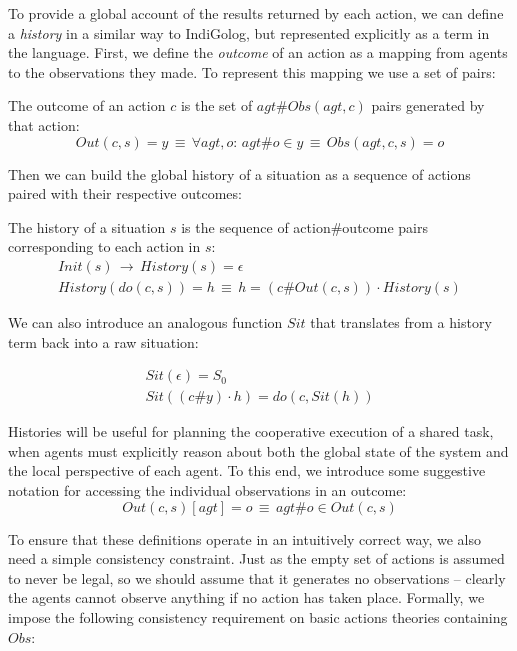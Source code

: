 To provide a global account of the results returned by each action,
we can define a \emph{history} in a similar way to IndiGolog, but
represented explicitly as a term in the language. First, we define
the \emph{outcome} of an action as a mapping from agents to the observations
they made. To represent this mapping we use a set of 
pairs:

\begin{defnL}
[{Outcomes}] The outcome of an action $c$ is the set of
$agt\#Obs(agt,c)$ pairs generated by that action:\[
Out(c,s)=y\,\equiv\,\forall agt,o:\, agt\#o\in y\,\equiv\, Obs(agt,c,s)=o\]

\end{defnL}
Then we can build the global history of a situation as a sequence
of actions paired with their respective outcomes:

\begin{defnL}
[{Histories}] The history of a situation $s$ is the sequence
of action\#outcome pairs corresponding to each action in $s$:\begin{gather*}
Init(s)\,\rightarrow\, History(s)=\epsilon\\
History(do(c,s))=h\,\equiv\, h=(c\#Out(c,s))\cdot History(s)\end{gather*}

\end{defnL}
We can also introduce an analogous function $Sit$ that translates
from a history term back into a raw situation:

\begin{gather*}
Sit(\epsilon)=S_{0}\\
Sit((c\#y)\cdot h)=do(c,Sit(h))\end{gather*}


Histories will be useful for planning the cooperative execution of
a shared task, when agents must explicitly reason about both the global
state of the system and the local perspective of each agent. To this
end, we introduce some suggestive notation for accessing the individual
observations in an outcome:\[
Out(c,s)[agt]=o\,\equiv\, agt\#o\in Out(c,s)\]


To ensure that these definitions operate in an intuitively correct
way, we also need a simple consistency constraint. Just as the empty
set of actions is assumed to never be legal, so we should assume that
it generates no observations -- clearly the agents cannot observe
anything if no action has taken place. Formally, we impose the following
consistency requirement on basic actions theories containing $Obs$:

